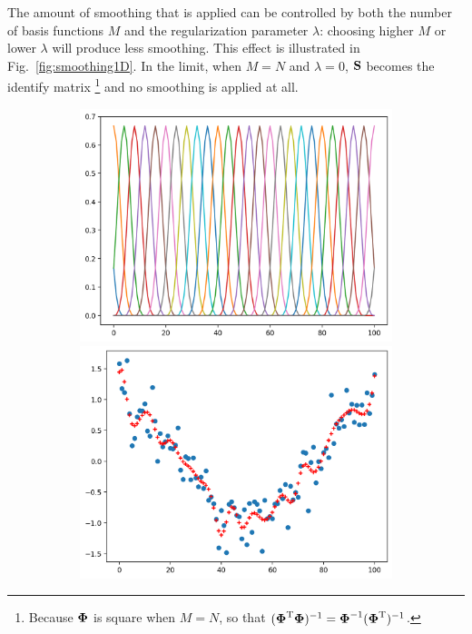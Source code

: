 \documentclass[10pt,twoside]{book}
\begin{document}
The amount of smoothing that is applied can be controlled by both the number of basis functions $M$ and the regularization parameter $\lambda$: choosing higher $M$ or lower $\lambda$ will produce less smoothing. 
This effect is illustrated in Fig.~\ref{fig:smoothing1D}.
In the limit, when $M = N$ and $\lambda = 0$, $\mathbf{S}$ becomes the identify matrix%
\footnote{Because ${\mbox{\boldmath {${\Phi}$}}}$ is square when $M=N$, so that $( {\mbox{\boldmath {${\Phi}$}}}^\mathrm{T} {\mbox{\boldmath {${\Phi}$}}} )^{-1} = {\mbox{\boldmath {${\Phi}$}}}^{-1} ({\mbox{\boldmath {${\Phi}$}}}^\mathrm{T})^{-1}$.}
and no smoothing is applied at all.  

\begin{figure}
  \centering
  \begin{subfigure}{0.32\textwidth}
     \centering
     \includegraphics[width=\textwidth]{smoothing_M28_gamma0_basisFunctions}
     \includegraphics[width=\textwidth]{smoothing_M28_gamma0_fitted}

\end{subfigure}
\end{figure}
\end{document}
